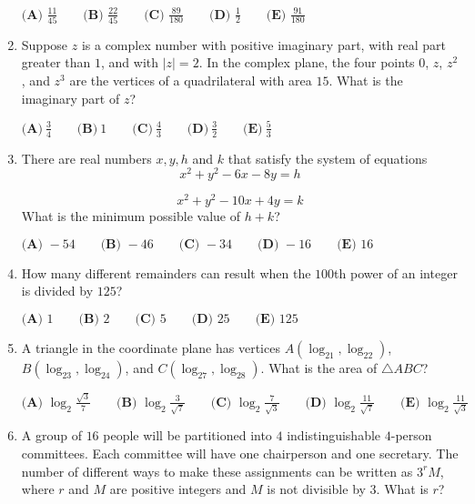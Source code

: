 \documentclass{article}
\begin{document}
\begin{enumerate}[label=\arabic*., itemsep=0.5em]
\(
\textbf{(A) }\frac{11}{45} \qquad
\textbf{(B) }\frac{22}{45} \qquad
\textbf{(C) }\frac{89}{180} \qquad
\textbf{(D) }\frac{1}{2} \qquad
\textbf{(E) }\frac{91}{180} \qquad
\)\par \vspace{0.5em}\item Suppose \(z\) is a complex number with positive imaginary part, with real part greater than \(1\), and with \(|z| = 2\). In the complex plane, the four points \(0\), \(z\), \(z^{2}\), and \(z^{3}\) are the vertices of a quadrilateral with area \(15\). What is the imaginary part of \(z\)?

\(\textbf{(A)}~\frac{3}{4}\qquad\textbf{(B)}~1\qquad\textbf{(C)}~\frac{4}{3}\qquad\textbf{(D)}~\frac{3}{2}\qquad\textbf{(E)}~\frac{5}{3}\)\par \vspace{0.5em}\item There are real numbers \(x,y,h\) and \(k\) that satisfy the system of equations
\begin{equation*}
x^2 + y^2 - 6x - 8y = h
\end{equation*}

\begin{equation*}
x^2 + y^2 - 10x + 4y = k
\end{equation*}
What is the minimum possible value of \(h+k\)?

\(
\textbf{(A) }-54 \qquad
\textbf{(B) }-46 \qquad
\textbf{(C) }-34 \qquad
\textbf{(D) }-16 \qquad
\textbf{(E) }16 \qquad
\)\par \vspace{0.5em}\item How many different remainders can result when the \(100\)th power of an integer is divided by \(125\)?

\(\textbf{(A) }1 \qquad\textbf{(B) }2 \qquad\textbf{(C) }5 \qquad\textbf{(D) }25 \qquad\textbf{(E) }125 \qquad\)\par \vspace{0.5em}\item A triangle in the coordinate plane has vertices \(A(\log_21,\log_22)\), \(B(\log_23,\log_24)\), and \(C(\log_27,\log_28)\). What is the area of \(\triangle ABC\)?

\(
\textbf{(A) }\log_2\frac{\sqrt3}7\qquad
\textbf{(B) }\log_2\frac3{\sqrt7}\qquad
\textbf{(C) }\log_2\frac7{\sqrt3}\qquad
\textbf{(D) }\log_2\frac{11}{\sqrt7}\qquad
\textbf{(E) }\log_2\frac{11}{\sqrt3}\qquad
\)\par \vspace{0.5em}\item A group of \(16\) people will be partitioned into \(4\) indistinguishable \(4\)-person committees. Each committee will have one chairperson and one secretary. The number of different ways to make these assignments can be written as \(3^{r}M\), where \(r\) and \(M\) are positive integers and \(M\) is not divisible by \(3\). What is \(r\)?


\end{enumerate}
\end{document}
